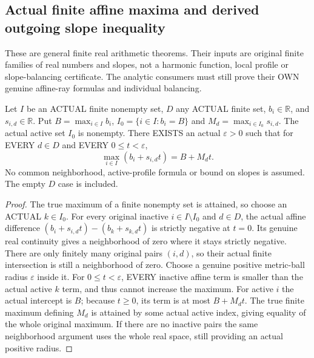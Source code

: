 \subsection{Actual finite affine maxima and derived outgoing slope inequality}

These are general finite real arithmetic theorems. Their inputs are original
finite families of real numbers and slopes, not a harmonic function, local
profile or slope-balancing certificate. The analytic consumers must still
prove their OWN genuine affine-ray formulas and individual balancing.

\begin{theorem}
\label{analysis:actual-finite-affine-active-max}
Let $I$ be an ACTUAL finite nonempty set, $D$ any ACTUAL finite set,
$b_i\in\mathbb R$, and $s_{i,d}\in\mathbb R$. Put
$B=\max_{i\in I}b_i$, $I_0=\{i\in I:b_i=B\}$ and
$M_d=\max_{i\in I_0}s_{i,d}$. The actual active set $I_0$ is nonempty.
There EXISTS an actual $\varepsilon>0$ such that for EVERY $d\in D$ and
EVERY $0\leq t<\varepsilon$,
\[
 \max_{i\in I}(b_i+s_{i,d}t)=B+M_dt.
\]
No common neighborhood, active-profile formula or bound on slopes is assumed.
The empty $D$ case is included.
\leanok
\end{theorem}
\begin{proof}
The true maximum of a finite nonempty set is attained, so choose an ACTUAL
$k\in I_0$. For every original inactive $i\in I\setminus I_0$ and
$d\in D$, the actual affine difference
$(b_i+s_{i,d}t)-(b_k+s_{k,d}t)$ is strictly negative at $t=0$.
Its genuine real continuity gives a neighborhood of zero where it stays
strictly negative. There are only finitely many original pairs $(i,d)$,
so their actual finite intersection is still a neighborhood of zero.
Choose a genuine positive metric-ball radius $\varepsilon$ inside it.
For $0\leq t<\varepsilon$, EVERY inactive affine term is smaller than the
actual active $k$ term, and thus cannot increase the maximum.
For active $i$ the actual intercept is $B$; because $t\geq0$, its term is
at most $B+M_dt$. The true finite maximum defining $M_d$ is attained by
some actual active index, giving equality of the whole original maximum.
If there are no inactive pairs the same neighborhood argument uses the
whole real space, still providing an actual positive radius.
\end{proof}

